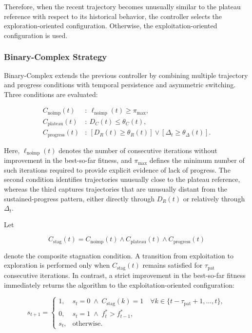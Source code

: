 \documentclass[journal,article,submit,moreauthors]{Definitions/mdpi}
\begin{document}
Therefore, when the recent trajectory becomes unusually similar to the
plateau reference with respect to its historical behavior, the controller
selects the exploration-oriented configuration. Otherwise, the
exploitation-oriented configuration is used.


\subsubsection{Binary-Complex Strategy}

Binary-Complex extends the previous controller by combining multiple
trajectory and progress conditions with temporal persistence and asymmetric
switching. Three conditions are evaluated:

\begin{align}
C_{\mathrm{noimp}}(t) &:\
\ell_{\mathrm{noimp}}(t) \geq \pi_{\max},
\label{eq:cond_noimp}\\
C_{\mathrm{plateau}}(t) &:\
D_C(t) \leq \theta_C(t),
\label{eq:cond_plateau}\\
C_{\mathrm{progress}}(t) &:\
\left[D_R(t) \geq \theta_R(t)\right]
\lor
\left[\Delta_t \geq \theta_{\Delta}(t)\right].
\label{eq:cond_progress}
\end{align}

Here, $\ell_{\mathrm{noimp}}(t)$ denotes the number of consecutive iterations
without improvement in the best-so-far fitness, and $\pi_{\max}$ defines the
minimum number of such iterations required to provide explicit evidence of
lack of progress. The second condition identifies trajectories unusually
close to the plateau reference, whereas the third captures trajectories that
are unusually distant from the sustained-progress pattern, either directly
through $D_R(t)$ or relatively through $\Delta_t$.

Let

\begin{equation}
C_{\mathrm{stag}}(t)
=
C_{\mathrm{noimp}}(t)
\land
C_{\mathrm{plateau}}(t)
\land
C_{\mathrm{progress}}(t)
\label{eq:composite_stagnation}
\end{equation}

denote the composite stagnation condition. A transition from exploitation
to exploration is performed only when $C_{\mathrm{stag}}(t)$ remains
satisfied for $\tau_{\mathrm{pat}}$ consecutive iterations. In contrast, a
strict improvement in the best-so-far fitness immediately returns the
algorithm to the exploitation-oriented configuration:

\begin{equation}
s_{t+1} =
\begin{cases}
1,
&
s_t=0
\;\land\;
C_{\mathrm{stag}}(k)=1
\quad
\forall k\in
\{t-\tau_{\mathrm{pat}}+1,\ldots,t\},
\\[2mm]
0,
&
s_t=1
\;\land\;
f_t^*>f_{t-1}^*,
\\[2mm]
s_t,
&
\text{otherwise}.
\end{cases}
\label{eq:binary_complex}
\end{equation}
\end{document}
